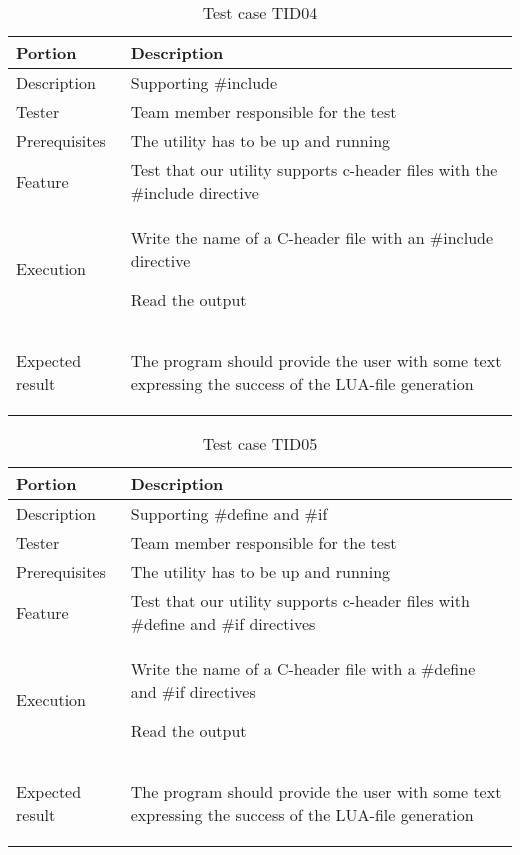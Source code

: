 \begin{table}[ht] \footnotesize \center
\caption{Test case TID04}
\begin{tabularx}{\textwidth}{l X}
	\toprule
	Portion & Description \\
	\midrule
	Description & Supporting \#include \\
	Tester & Team member responsible for the test \\
	Prerequisites & The utility has to be up and running \\
	Feature & Test that our utility supports c-header files with the \#include directive \\
	Execution & \begin{packed_enum}
		\item Write the name of a C-header file with an \#include directive
		\item Read the output \end{packed_enum} \\
	Expected result & \begin{packed_enum}
		\setcounter{enumi}{1}
		\item The program should provide the user with some text expressing the success of the LUA-file generation \end{packed_enum} \\
	\bottomrule
\end{tabularx}
\end{table}

\begin{table}[ht] \footnotesize \center
\caption{Test case TID05}
\begin{tabularx}{\textwidth}{l X}
	\toprule
	Portion & Description \\
	\midrule
	Description & Supporting \#define and \#if \\
	Tester & Team member responsible for the test \\
	Prerequisites & The utility has to be up and running \\
	Feature & Test that our utility supports c-header files with \#define and \#if directives \\
	Execution & \begin{packed_enum}
		\item Write the name of a C-header file with a \#define and \#if directives
		\item Read the output \end{packed_enum} \\
	Expected result & \begin{packed_enum}
		\setcounter{enumi}{1}
		\item The program should provide the user with some text expressing the success of the LUA-file generation \end{packed_enum} \\
	\bottomrule
\end{tabularx}
\end{table}

